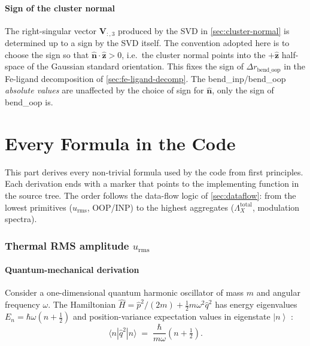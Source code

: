 \documentclass[10pt,a4paper,twoside]{article}
\newcommand{\zhat}{\hat{\mathbf{z}}}
\newcommand{\nhat}{\hat{\mathbf{n}}}
\newcommand{\urms}{u_{\mathrm{rms}}}
\newcommand{\ket}[1]{\left|#1\right\rangle}
\newcommand{\codref}[1]{%
  \quad\text{\textcolor{gray!70!black}{\footnotesize $\rightsquigarrow$~\texttt{#1}}}}
\begin{document}
\subsection{Sign of the cluster normal}
\label{sec:conv-normal-sign}

\codref{geometry.cluster\_normal}

The right-singular vector $\mathbf{V}_{:,3}$ produced by the SVD in
\cref{sec:cluster-normal} is determined up to a sign by the SVD
itself. The convention adopted here is to choose the sign so that
$\nhat \cdot \zhat > 0$, i.e.\ the cluster normal points into the
$+\zhat$ half-space of the Gaussian standard orientation. This fixes
the sign of $\Delta r_\text{bend\_oop}$ in the Fe-ligand decomposition
of \cref{sec:fe-ligand-decomp}. The bend\_inp/bend\_oop \emph{absolute
values} are unaffected by the choice of sign for $\nhat$, only the
sign of bend\_oop is.

\part{Every Formula in the Code}

This part derives every non-trivial formula used by the code from
first principles. Each derivation ends with a \codref{} marker that
points to the implementing function in the source tree. The order
follows the data-flow logic of \cref{sec:dataflow}: from the lowest
primitives ($\urms$, OOP/INP) to the highest aggregates
($\Lambda_X^\text{total}$, modulation spectra).

\section{Thermal RMS amplitude $\urms$}
\label{sec:urms-derivation}

\subsection{Quantum-mechanical derivation}

Consider a one-dimensional quantum harmonic oscillator of mass $m$
and angular frequency $\omega$. The Hamiltonian
$\hat{H} = \hat{p}^2/(2m) + \tfrac{1}{2}m\omega^2 \hat{q}^2$ has
energy eigenvalues $E_n = \hbar\omega(n + \tfrac{1}{2})$ and
position-variance expectation values in eigenstate $\ket{n}$
\cite{WilsonDeciusCross1955}:
\begin{equation}
  \langle n | \hat{q}^2 | n \rangle
    \;=\; \frac{\hbar}{m\omega}\left(n + \tfrac{1}{2}\right).
  \label{eq:qho-q2-eigen}
\end{equation}
\end{document}
